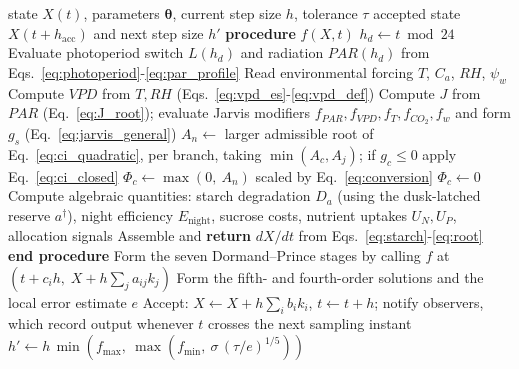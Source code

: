 \documentclass[a4paper,fleqn]{cas-sc}
\begin{document}
\begin{algorithm}[!htbp]
\caption{Derivative evaluation $f(X,t)$ and one accepted integration step.
Lines 1--13 constitute the right-hand side and are executed once per
Runge--Kutta stage, i.e.\ several times per trial step and also for trial
steps that are rejected. Lines 14--17 are the integrator's step logic. The
gas-exchange operating point is obtained in closed form, so no inner
iteration appears; the iterative alternative of
Algorithm~\ref{alg:ci_fixedpoint} substitutes for line~8 only when explicitly
selected for the verification study of Section~\ref{sec:verification}.}
\label{alg:simulation_step}
\begin{algorithmic}[1]
\REQUIRE state $X(t)$, parameters $\boldsymbol{\theta}$, current step size $h$, tolerance $\tau$
\ENSURE accepted state $X(t+h_{\text{acc}})$ and next step size $h'$
\STATE \textbf{procedure} $f(X,t)$ 
\STATE $h_d \leftarrow t \bmod 24$ 
\STATE Evaluate photoperiod switch $L(h_d)$ and radiation $\mathit{PAR}(h_d)$ from Eqs.~\eqref{eq:photoperiod}-\eqref{eq:par_profile}
\STATE Read environmental forcing $T$, $C_a$, $\mathit{RH}$, $\psi_w$
\STATE Compute $\mathit{VPD}$ from $T,\mathit{RH}$ (Eqs.~\eqref{eq:vpd_es}-\eqref{eq:vpd_def})
  \STATE Compute $J$ from $\mathit{PAR}$ (Eq.~\eqref{eq:J_root}); evaluate Jarvis modifiers $f_{\mathit{PAR}},f_{\mathit{VPD}},f_T,f_{\mathit{CO_2}},f_w$ and form $g_s$ (Eq.~\eqref{eq:jarvis_general})
  \STATE $A_n \leftarrow$ larger admissible root of Eq.~\eqref{eq:ci_quadratic}, per branch, taking $\min(A_c,A_j)$; if $g_c \le 0$ apply Eq.~\eqref{eq:ci_closed}
  \STATE $\Phi_c \leftarrow \max\!\left(0,\ A_n\right)$ scaled by Eq.~\eqref{eq:conversion} 
\ELSE
  \STATE $\Phi_c \leftarrow 0$
\ENDIF
\STATE Compute algebraic quantities: starch degradation $D_a$ (using the dusk-latched reserve $a^{\dagger}$), night efficiency $E_{\text{night}}$, sucrose costs, nutrient uptakes $U_N,U_P$, allocation signals
\STATE Assemble and \textbf{return} $dX/dt$ from Eqs.~\eqref{eq:starch}-\eqref{eq:root}
\STATE \textbf{end procedure}
\STATE Form the seven Dormand--Prince stages by calling $f$ at $(t+c_ih,\;X+h\sum_j a_{ij}k_j)$
\STATE Form the fifth- and fourth-order solutions and the local error estimate $e$
  \STATE Accept: $X \leftarrow X + h\sum_i b_i k_i$, $t \leftarrow t+h$; notify observers, which record output whenever $t$ crosses the next sampling instant
\ENDIF
\STATE $h' \leftarrow h\,\min\!\left(f_{\max},\ \max\!\left(f_{\min},\ \sigma\,(\tau/e)^{1/5}\right)\right)$ 
\end{algorithmic}
\end{algorithm}
\end{document}

